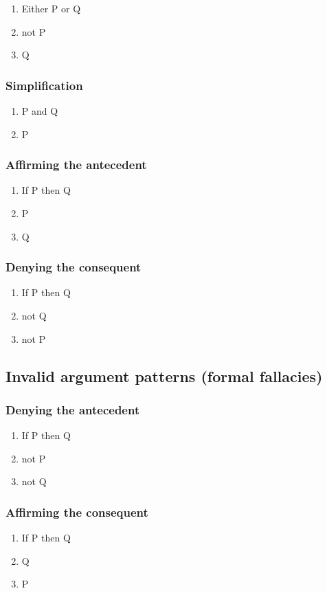 \begin{enumerate}
    \item Either P or Q
    \item not P
    \item Q
\end{enumerate}

\subsubsection{Simplification}

\begin{enumerate}
    \item P and Q
    \item P
\end{enumerate}

\subsubsection{Affirming the antecedent}

\begin{enumerate}
    \item If P then Q
    \item P
    \item Q
\end{enumerate}

\subsubsection{Denying the consequent}

\begin{enumerate}
    \item If P then Q
    \item not Q
    \item not P
\end{enumerate}

\subsection{Invalid argument patterns (formal fallacies)}

\subsubsection{Denying the antecedent}

\begin{enumerate}
    \item If P then Q
    \item not P
    \item not Q
\end{enumerate}

\subsubsection{Affirming the consequent}

\begin{enumerate}
    \item If P then Q
    \item Q
    \item P
\end{enumerate}

